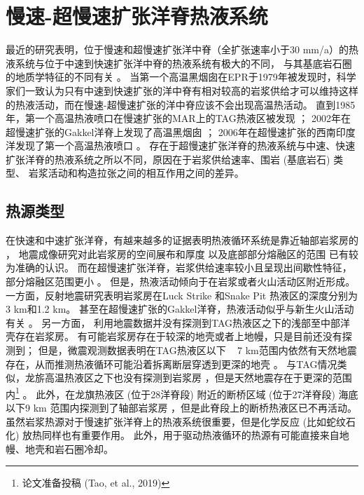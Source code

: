 \section{慢速-超慢速扩张洋脊热液系统}  
最近的研究表明，位于慢速和超慢速扩张洋中脊（全扩张速率小于30 mm/a）的热液系统与位于中速到快速扩张洋中脊的热液系统有极大的不同，
与其基底岩石圈的地质学特征的不同有关 \citep{rona2010diversity} 。
当第一个高温黑烟囱在EPR于1979年被发现时，科学家们一致认为只有中速到快速扩张的洋中脊有相对较高的岩浆供给才可以维持这样的热液活动，而在慢速-超慢速扩张的洋中脊应该不会出现高温热活动。
直到1985年，第一个高温热液喷口在慢速扩张的MAR上的TAG热液区被发现 \citep{rona1986black} ；
2002年在超慢速扩张的Gakkel洋脊上发现了高温黑烟囱 \citep{edmonds2003discovery} ；
2006年在超慢速扩张的西南印度洋发现了第一个高温热液喷口 \citep{tao2012first} 。
存在于超慢速扩张洋脊的热液系统与中速、快速扩张洋脊的热液系统之所以不同，原因在于岩浆供给速率、围岩 (基底岩石) 类型、
岩浆活动和构造拉张之间的相互作用之间的差异。

\subsection{热源类型}  
在快速和中速扩张洋脊，有越来越多的证据表明热液循环系统是靠近轴部岩浆房的 \citep{singh2006discovery,canales2006seismic} ，
地震成像研究对此岩浆房的空间展布和厚度 \citep{detrick1987multi,kent1990evidence,van2007seismic,jacobs2007axial} 以及底部部分熔融区的范围 \citep{dunn2000three} 已有较为准确的认识。
而在超慢速扩张洋脊，岩浆供给速率较小且呈现出间歇性特征，部分熔融区范围更小 \citep{sinton1992mid} 。
但是，热液活动倾向于在岩浆或者火山活动区附近形成。
一方面，反射地震研究表明岩浆房在Luck Strike \citep{singh2006discovery} 和Snake Pit \citep{calvert1995seismic} 热液区的深度分别为3 km和1.2 km。
甚至在超慢速扩张的Gakkel洋脊，热液活动似乎与新生火山活动有关 \citep{michael2003magmatic,baker2004hydrothermal} 。
另一方面， \cite{canales2007crustal} 利用地震数据并没有探测到TAG热液区之下的浅部至中部洋壳存在岩浆房。
有可能岩浆房存在于较深的地壳或者上地幔，只是目前还没有探测到；
但是，微震观测数据表明在TAG热液区以下 ~ 7 km范围内依然有天然地震存在，从而推测热液循环可能沿着拆离断层穿透到更深的地壳 \citep{sohn2007kinematics} 。
与TAG情况类似，龙旂高温热液区之下也没有探测到岩浆房 \citep{niu2015along,zhao2013three,li2015seismic} ，但是天然地震存在于更深的范围内\footnote{论文准备投稿 (Tao, et al., 2019)} 。
此外，在龙旗热液区 (位于28洋脊段) 附近的断桥区域 (位于27洋脊段) 海底以下9 km 范围内探测到了轴部岩浆房 \citep{jian2017evidence} ，但是此脊段上的断桥热液区已不再活动。
虽然岩浆热源对于慢速扩张洋脊上的热液系统很重要，但是化学反应 (比如蛇纹石化) 放热同样也有重要作用。
此外，用于驱动热液循环的热源有可能直接来自地幔、地壳和岩石圈冷却。


